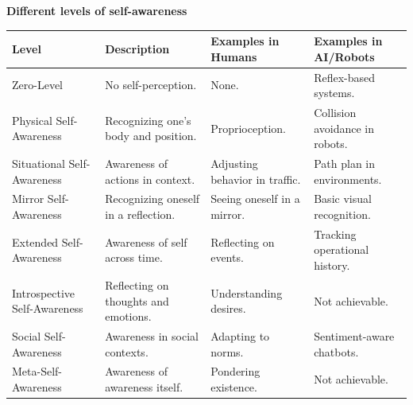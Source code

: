 \documentclass{book}
\providecommand{\ProjectDeepHeading}[2]{%
    \par\medskip\noindent\textbf{#2}\par\smallskip
}
\begin{document}
\ProjectDeepHeading{1}{Different levels of self-awareness}
\begin{tabular}{|l|l|l|l|}
    \hline
    \textbf{Level}               & \textbf{Description}                 & \textbf{Examples in Humans}    & \textbf{Examples in AI/Robots} \\ \hline
    Zero-Level                   & No self-perception.                  & None.                          & Reflex-based systems.          \\ \hline
    Physical Self-Awareness      & Recognizing one’s body and position. & Proprioception.                & Collision avoidance in robots. \\ \hline
    Situational Self-Awareness   & Awareness of actions in context.     & Adjusting behavior in traffic. & Path plan in environments. \\ \hline
    Mirror Self-Awareness        & Recognizing oneself in a reflection. & Seeing oneself in a mirror. & Basic visual recognition. \\ \hline
    Extended Self-Awareness      & Awareness of self across time.       & Reflecting on events.          & Tracking operational history.  \\ \hline
    Introspective Self-Awareness & Reflecting on thoughts and emotions. & Understanding desires. & Not achievable. \\ \hline
    Social Self-Awareness        & Awareness in social contexts.        & Adapting to norms.             & Sentiment-aware chatbots.      \\ \hline
    Meta-Self-Awareness          & Awareness of awareness itself.       & Pondering existence.           & Not achievable.                \\ \hline
\end{tabular}
\end{document}
